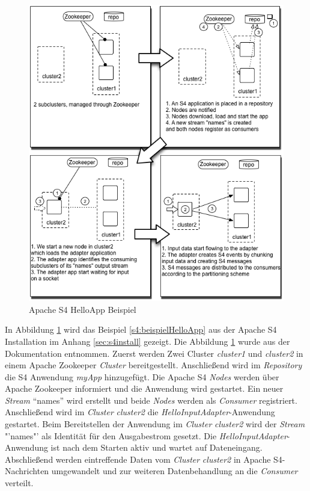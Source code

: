 \begin{figure}[htb!]
\centering
\includegraphics[width=1.0\textwidth]{bilder/s4SampleAppDeployment.png}
\caption{Apache S4 HelloApp Beispiel
\label{fig:s4HelloApp}}
\end{figure}

In Abbildung \ref{fig:s4HelloApp} wird das Beispiel \ref{s4:beispielHelloApp} aus der Apache S4 Installation im Anhang \ref{sec:s4install} gezeigt. Die Abbildung \ref{fig:s4HelloApp} wurde aus der Dokumentation  entnommen. Zuerst werden Zwei Cluster \textit{cluster1} und \textit{cluster2} in einem Apache Zookeeper \textit{Cluster} bereitgestellt. Anschließend wird im \textit{Repository} die S4 Anwendung \textit{myApp} hinzugefügt. Die Apache S4 \textit{Nodes} werden über Apache Zookeeper informiert und die Anwendung wird gestartet. Ein neuer \textit{Stream} "`names"' wird erstellt und beide \textit{Nodes} werden als \textit{Consumer} registriert. Anschließend wird im \textit{Cluster} \textit{cluster2} die \textit{HelloInputAdapter}-Anwendung gestartet. Beim Bereitstellen der Anwendung im \textit{Cluster} \textit{cluster2} wird der \textit{Stream} "'names"' als Identität für den Ausgabestrom gesetzt. Die \textit{HelloInputAdapter}-Anwendung ist nach dem Starten aktiv und wartet auf Dateneingang. Abschließend werden eintreffende Daten vom \textit{Cluster} \textit{cluster2} in Apache S4-Nachrichten umgewandelt und zur weiteren Datenbehandlung an die \textit{Consumer} verteilt.


